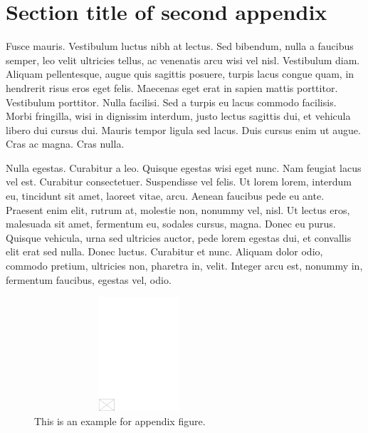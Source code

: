 \documentclass[AMA,STIX1COL]{WileyNJD-SP}
\begin{document}
\section{Section title of second appendix\label{app2}}%

Fusce mauris. Vestibulum luctus nibh at lectus. Sed bibendum, nulla a faucibus semper, leo velit ultricies tellus, ac
venenatis arcu wisi vel nisl. Vestibulum diam. Aliquam pellentesque, augue quis sagittis posuere, turpis lacus congue
quam, in hendrerit risus eros eget felis. Maecenas eget erat in sapien mattis porttitor. Vestibulum porttitor. Nulla
facilisi. Sed a turpis eu lacus commodo facilisis. Morbi fringilla, wisi in dignissim interdum, justo lectus sagittis dui, et
vehicula libero dui cursus dui. Mauris tempor ligula sed lacus. Duis cursus enim ut augue. Cras ac magna. Cras nulla.

Nulla egestas. Curabitur a leo. Quisque egestas wisi eget nunc. Nam feugiat lacus vel est. Curabitur consectetuer.
Suspendisse vel felis. Ut lorem lorem, interdum eu, tincidunt sit amet, laoreet vitae, arcu. Aenean faucibus pede eu
ante. Praesent enim elit, rutrum at, molestie non, nonummy vel, nisl. Ut lectus eros, malesuada sit amet, fermentum
eu, sodales cursus, magna. Donec eu purus. Quisque vehicula, urna sed ultricies auctor, pede lorem egestas dui, et
convallis elit erat sed nulla. Donec luctus. Curabitur et nunc. Aliquam dolor odio, commodo pretium, ultricies non,
pharetra in, velit. Integer arcu est, nonummy in, fermentum faucibus, egestas vel, odio.

\begin{figure}[t]
\centerline{\includegraphics[height=10pc,width=78mm,draft]{empty}}
\caption{This is an example for appendix figure.\label{fig5}}
\end{figure}
\end{document}
